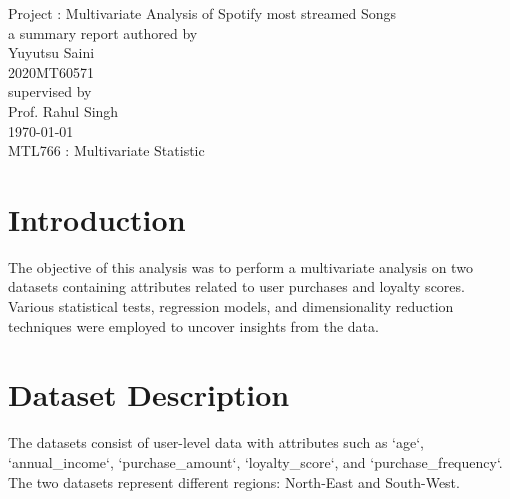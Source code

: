 \documentclass[11pt]{article}
\begin{document}
\begin{titlepage}

\centering
\vspace{7cm}
\huge Project : Multivariate Analysis of Spotify most streamed Songs\\ 
\vspace{2cm}
\Large a summary report authored by\\ 

\LARGE Yuyutsu Saini\\
\vspace{1mm}
\Large 2020MT60571\\
\vspace{2cm}
\Large supervised by\\
\Large Prof. Rahul Singh\\
\vspace{2cm}
\Large \today \\
\vspace{2cm}
\LARGE MTL766 : Multivariate Statistic

\end{titlepage}

\tableofcontents
\section{Introduction}
The objective of this analysis was to perform a multivariate analysis on two datasets containing attributes related to user purchases and loyalty scores. Various statistical tests, regression models, and dimensionality reduction techniques were employed to uncover insights from the data.

\section{Dataset Description}
The datasets consist of user-level data with attributes such as `age`, `annual\_income`, `purchase\_amount`, `loyalty\_score`, and `purchase\_frequency`. The two datasets represent different regions: North-East and South-West.
\end{document}
